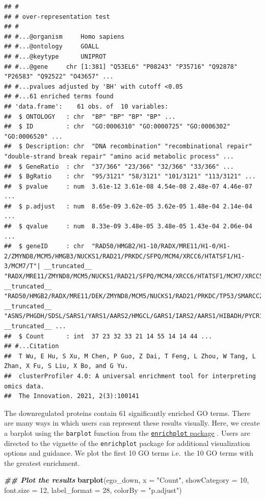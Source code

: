 \documentclass[9pt,a4paper,]{extarticle}
\newenvironment{Shaded}{\begin{snugshade}}{\end{snugshade}}
\newcommand{\AttributeTok}[1]{\textcolor[rgb]{0.13,0.29,0.53}{#1}}
\newcommand{\DecValTok}[1]{\textcolor[rgb]{0.00,0.00,0.81}{#1}}
\newcommand{\DocumentationTok}[1]{\textcolor[rgb]{0.56,0.35,0.01}{\textbf{\textit{#1}}}}
\newcommand{\FunctionTok}[1]{\textcolor[rgb]{0.13,0.29,0.53}{\textbf{#1}}}
\newcommand{\NormalTok}[1]{#1}
\newcommand{\StringTok}[1]{\textcolor[rgb]{0.31,0.60,0.02}{#1}}
\begin{document}
\begin{verbatim}
## #
## # over-representation test
## #
## #...@organism     Homo sapiens 
## #...@ontology     GOALL 
## #...@keytype      UNIPROT 
## #...@gene     chr [1:381] "Q53EL6" "P08243" "P35716" "Q92878" "P26583" "Q92522" "O43657" ...
## #...pvalues adjusted by 'BH' with cutoff <0.05 
## #...61 enriched terms found
## 'data.frame':    61 obs. of  10 variables:
##  $ ONTOLOGY   : chr  "BP" "BP" "BP" "BP" ...
##  $ ID         : chr  "GO:0006310" "GO:0000725" "GO:0006302" "GO:0006520" ...
##  $ Description: chr  "DNA recombination" "recombinational repair" "double-strand break repair" "amino acid metabolic process" ...
##  $ GeneRatio  : chr  "37/366" "23/366" "32/366" "33/366" ...
##  $ BgRatio    : chr  "95/3121" "58/3121" "101/3121" "113/3121" ...
##  $ pvalue     : num  3.61e-12 3.61e-08 4.54e-08 2.48e-07 4.46e-07 ...
##  $ p.adjust   : num  8.65e-09 3.62e-05 3.62e-05 1.48e-04 2.14e-04 ...
##  $ qvalue     : num  8.33e-09 3.48e-05 3.48e-05 1.43e-04 2.06e-04 ...
##  $ geneID     : chr  "RAD50/HMGB2/H1-10/RADX/MRE11/H1-0/H1-2/ZMYND8/MCM5/HMGB3/NUCKS1/RAD21/PRKDC/SFPQ/MCM4/XRCC6/HTATSF1/H1-3/MCM7/T"| __truncated__ "RADX/MRE11/ZMYND8/MCM5/NUCKS1/RAD21/SFPQ/MCM4/XRCC6/HTATSF1/MCM7/XRCC5/PPP4R2/POGZ/YY1/MCM3/MCM2/VPS72/PARP1/BR"| __truncated__ "RAD50/HMGB2/RADX/MRE11/DEK/ZMYND8/MCM5/NUCKS1/RAD21/PRKDC/TP53/SMARCC2/SFPQ/MCM4/XRCC6/HPF1/HTATSF1/MCM7/XRCC5/"| __truncated__ "ASNS/PHGDH/SDSL/SARS1/YARS1/AARS2/HMGCL/GARS1/IARS2/AARS1/HIBADH/PYCR1/ACADSB/DHFR/MCCC2/SLC25A12/MARS1/PSAT1/S"| __truncated__ ...
##  $ Count      : int  37 23 32 33 21 14 55 14 14 44 ...
## #...Citation
##  T Wu, E Hu, S Xu, M Chen, P Guo, Z Dai, T Feng, L Zhou, W Tang, L Zhan, X Fu, S Liu, X Bo, and G Yu.
##  clusterProfiler 4.0: A universal enrichment tool for interpreting omics data.
##  The Innovation. 2021, 2(3):100141
\end{verbatim}

The downregulated proteins contain 61 significantly enriched GO
terms. There are many ways in which users can represent these results visually.
Here, we create a barplot using the \texttt{barplot} function from the \href{https://bioconductor.org/packages/release/bioc/html/enrichplot.html}{\texttt{enrichplot} package}
\citep{enrichplot}. Users are directed to the vignette of the \texttt{enrichplot} package
for additional visualization options and guidance. We plot the first 10 GO terms
i.e.~the 10 GO terms with the greatest enrichment.

\begin{Shaded}
\begin{Highlighting}[]
\DocumentationTok{\#\# Plot the results}
\FunctionTok{barplot}\NormalTok{(ego\_down,}
        \AttributeTok{x =} \StringTok{"Count"}\NormalTok{,}
        \AttributeTok{showCategory =} \DecValTok{10}\NormalTok{,}
        \AttributeTok{font.size =} \DecValTok{12}\NormalTok{,}
        \AttributeTok{label\_format =} \DecValTok{28}\NormalTok{,}
        \AttributeTok{colorBy =} \StringTok{"p.adjust"}\NormalTok{)}
\end{Highlighting}
\end{Shaded}
\end{document}
